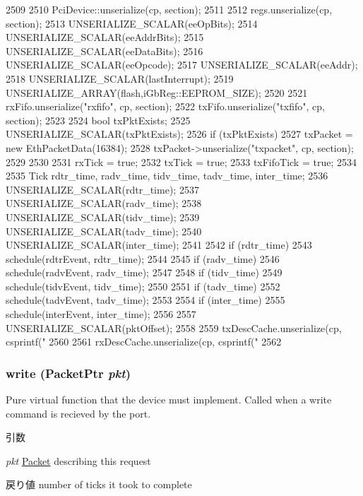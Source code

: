 \begin{DoxyCode}
2509 {
2510     PciDevice::unserialize(cp, section);
2511 
2512     regs.unserialize(cp, section);
2513     UNSERIALIZE_SCALAR(eeOpBits);
2514     UNSERIALIZE_SCALAR(eeAddrBits);
2515     UNSERIALIZE_SCALAR(eeDataBits);
2516     UNSERIALIZE_SCALAR(eeOpcode);
2517     UNSERIALIZE_SCALAR(eeAddr);
2518     UNSERIALIZE_SCALAR(lastInterrupt);
2519     UNSERIALIZE_ARRAY(flash,iGbReg::EEPROM_SIZE);
2520 
2521     rxFifo.unserialize("rxfifo", cp, section);
2522     txFifo.unserialize("txfifo", cp, section);
2523 
2524     bool txPktExists;
2525     UNSERIALIZE_SCALAR(txPktExists);
2526     if (txPktExists) {
2527         txPacket = new EthPacketData(16384);
2528         txPacket->unserialize("txpacket", cp, section);
2529     }
2530 
2531     rxTick = true;
2532     txTick = true;
2533     txFifoTick = true;
2534 
2535     Tick rdtr_time, radv_time, tidv_time, tadv_time, inter_time;
2536     UNSERIALIZE_SCALAR(rdtr_time);
2537     UNSERIALIZE_SCALAR(radv_time);
2538     UNSERIALIZE_SCALAR(tidv_time);
2539     UNSERIALIZE_SCALAR(tadv_time);
2540     UNSERIALIZE_SCALAR(inter_time);
2541 
2542     if (rdtr_time)
2543         schedule(rdtrEvent, rdtr_time);
2544 
2545     if (radv_time)
2546         schedule(radvEvent, radv_time);
2547 
2548     if (tidv_time)
2549         schedule(tidvEvent, tidv_time);
2550 
2551     if (tadv_time)
2552         schedule(tadvEvent, tadv_time);
2553 
2554     if (inter_time)
2555         schedule(interEvent, inter_time);
2556 
2557     UNSERIALIZE_SCALAR(pktOffset);
2558 
2559     txDescCache.unserialize(cp, csprintf("%
2560 
2561     rxDescCache.unserialize(cp, csprintf("%
2562 }
\end{DoxyCode}
\hypertarget{classIGbE_a4cefab464e72b5dd42c003a0a4341802}{
\subsubsection[{write}]{ write ({\bf PacketPtr} {\em pkt})}}
\label{classIGbE_a4cefab464e72b5dd42c003a0a4341802}
Pure virtual function that the device must implement. Called when a write command is recieved by the port. 
\begin{DoxyParams}{引数}
\item[{\em pkt}]\hyperlink{classPacket}{Packet} describing this request \end{DoxyParams}
\begin{DoxyReturn}{戻り値}
number of ticks it took to complete 
\end{DoxyReturn}


